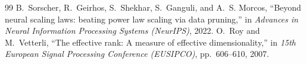 \documentclass[a4paper, 12pt]{report}
\begin{document}
\ifdefined\isincluded
\else
\begin{thebibliography}{99}
 B.~Sorscher, R.~Geirhos, S.~Shekhar, S.~Ganguli, and A.~S. Morcos, ``Beyond neural scaling laws: beating power law scaling via data pruning,'' in \emph{Advances in Neural Information Processing Systems (NeurIPS)}, 2022.
 O.~Roy and M.~Vetterli, ``The effective rank: A measure of effective dimensionality,'' in \emph{15th European Signal Processing Conference (EUSIPCO)}, pp.~606--610, 2007.
\end{thebibliography}
\end{document}
